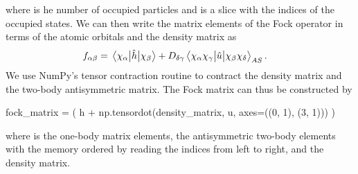             where  is he number of occupied particles and  is a
            slice with the indices of the occupied states.
            We can then write the matrix elements of the Fock operator in terms
            of the atomic orbitals and the density matrix as
            \begin{align}
                f_{\alpha\beta}
                &= \mel{\chi_{\alpha}}{\hat{h}}{\chi_{\beta}}
                +
                D_{\delta\gamma}
                \mel{\chi_{\alpha}\chi_{\gamma}}{\hat{u}}{\chi_{\beta}\chi_{\delta}}_{AS}.
                \label{eq:ghf-fock-matrix}
            \end{align}
            We use NumPy's tensor contraction routine  to
            contract the density matrix and the two-body antisymmetric matrix.
            The Fock matrix can thus be constructed by
            \begin{python}
fock_matrix = (
    h + np.tensordot(density_matrix, u, axes=((0, 1), (3, 1)))
)
            \end{python}
            where  is the one-body matrix elements,  the
            antisymmetric two-body elements with the memory ordered by reading
            the indices from left to right, and  the
            density matrix.


